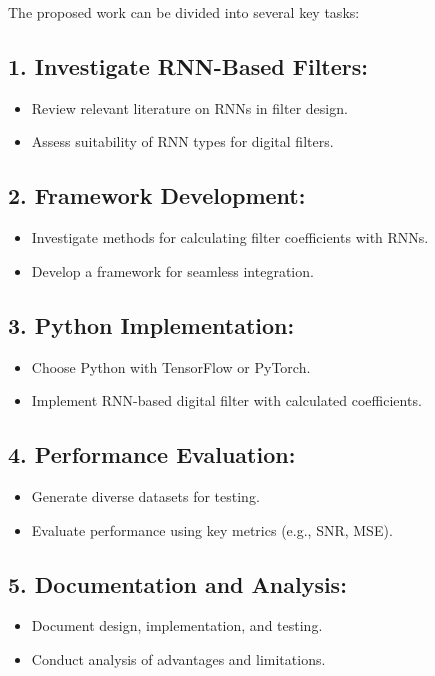 The proposed work can be divided into several key tasks:

\subsection*{1. Investigate RNN-Based Filters:}
\begin{itemize}
	\item Review relevant literature on RNNs in filter design.
	\item Assess suitability of RNN types for digital filters.
\end{itemize}

\subsection*{2. Framework Development:}
\begin{itemize}
	\item Investigate methods for calculating filter coefficients with RNNs.
	\item Develop a framework for seamless integration.
\end{itemize}

\subsection*{3. Python Implementation:}
\begin{itemize}
	\item Choose Python with TensorFlow or PyTorch.
	\item Implement RNN-based digital filter with calculated coefficients.
\end{itemize}

\subsection*{4. Performance Evaluation:}
\begin{itemize}
	\item Generate diverse datasets for testing.
	\item Evaluate performance using key metrics (e.g., SNR, MSE).
\end{itemize}

\subsection*{5. Documentation and Analysis:}
\begin{itemize}
	\item Document design, implementation, and testing.
	\item Conduct analysis of advantages and limitations.
\end{itemize}